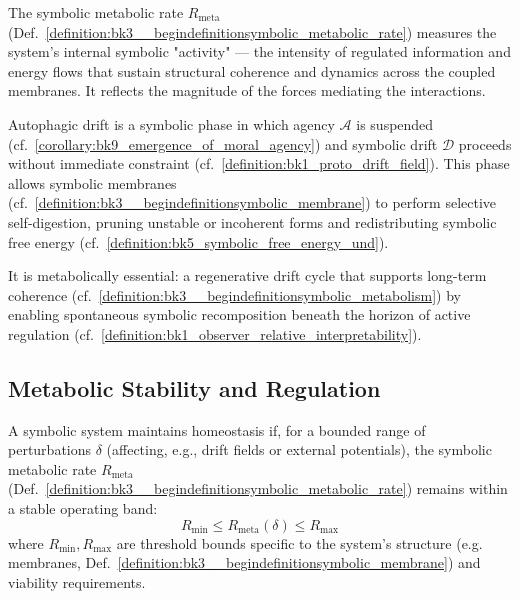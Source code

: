 \begin{remark} \label{remark:bk3__beginremark}
The symbolic metabolic rate $R_{\text{meta}}$ (Def.~\ref{definition:bk3__begindefinitionsymbolic_metabolic_rate}) measures the system's internal symbolic "activity" — the intensity of regulated information and energy flows that sustain structural coherence and dynamics across the coupled membranes. It reflects the magnitude of the forces mediating the interactions.
\end{remark}

\begin{definition} \label{definition:bk3_autophagic_drift}
Autophagic drift is a symbolic phase in which agency $\mathcal{A}$ is suspended (cf.~\ref{corollary:bk9_emergence_of_moral_agency}) 
and symbolic drift $\mathcal{D}$ proceeds without immediate constraint (cf.~\ref{definition:bk1_proto_drift_field}). 
This phase allows symbolic membranes (cf.~\ref{definition:bk3__begindefinitionsymbolic_membrane}) 
to perform selective self-digestion, pruning unstable or incoherent forms and redistributing symbolic free energy (cf.~\ref{definition:bk5_symbolic_free_energy_und}).

It is metabolically essential: a regenerative drift cycle that supports long-term coherence (cf.~\ref{definition:bk3__begindefinitionsymbolic_metabolism}) 
by enabling spontaneous symbolic recomposition beneath the horizon of active regulation (cf.~\ref{definition:bk1_observer_relative_interpretability}).
\end{definition}

\subsection{Metabolic Stability and Regulation}

\begin{definition} \label{definition:bk3__begindefinitionsymbolic_homeostasis}
A symbolic system maintains homeostasis if, for a bounded range of perturbations $\delta$ (affecting, e.g., drift fields or external potentials), the symbolic metabolic rate $R_{\text{meta}}$ (Def.~\ref{definition:bk3__begindefinitionsymbolic_metabolic_rate}) remains within a stable operating band:
\[
R_{\text{min}} \leq R_{\text{meta}}(\delta) \leq R_{\text{max}}
\]
where $R_{\text{min}}, R_{\text{max}}$ are threshold bounds specific to the system's structure (e.g. membranes, Def.~\ref{definition:bk3__begindefinitionsymbolic_membrane}) and viability requirements.
\end{definition}


